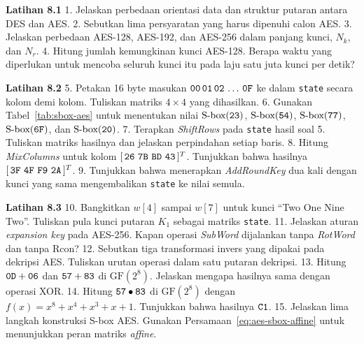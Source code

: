 \begin{obereflection}
\textbf{Latihan 8.1}
1. Jelaskan perbedaan orientasi data dan struktur putaran antara DES dan AES.
2. Sebutkan lima persyaratan yang harus dipenuhi calon AES.
3. Jelaskan perbedaan AES-128, AES-192, dan AES-256 dalam panjang kunci,
   $N_k$, dan $N_r$.
4. Hitung jumlah kemungkinan kunci AES-128. Berapa waktu yang diperlukan untuk
   mencoba seluruh kunci itu pada laju satu juta kunci per detik?

\textbf{Latihan 8.2}
5. Petakan 16 byte masukan $\texttt{00}\,\texttt{01}\,\texttt{02}\,\dots\,\texttt{0F}$
   ke dalam \texttt{state} secara kolom demi kolom. Tuliskan matriks
   $4 \times 4$ yang dihasilkan.
6. Gunakan Tabel~\ref{tab:sbox-aes} untuk menentukan nilai
   $\text{S-box}(\texttt{23})$, $\text{S-box}(\texttt{54})$,
   $\text{S-box}(\texttt{77})$, $\text{S-box}(\texttt{6F})$, dan
   $\text{S-box}(\texttt{20})$.
7. Terapkan \textit{ShiftRows} pada \texttt{state} hasil soal 5. Tuliskan
   matriks hasilnya dan jelaskan perpindahan setiap baris.
8. Hitung \textit{MixColumns} untuk kolom
   $[\,\code{26}\ \code{7B}\ \code{BD}\ \code{43}\,]^{T}$. Tunjukkan bahwa
   hasilnya $[\,\code{3F}\ \code{4F}\ \code{F9}\ \code{2A}\,]^{T}$.
9. Tunjukkan bahwa menerapkan \textit{AddRoundKey} dua kali dengan kunci yang
   sama mengembalikan \texttt{state} ke nilai semula.

\textbf{Latihan 8.3}
10. Bangkitkan $w[4]$ sampai $w[7]$ untuk kunci
    ``Two One Nine Two''. Tuliskan pula kunci putaran $K_1$ sebagai matriks
    \texttt{state}.
11. Jelaskan aturan \textit{expansion key} pada AES-256. Kapan operasi
    \textit{SubWord} dijalankan tanpa \textit{RotWord} dan tanpa Rcon?
12. Sebutkan tiga transformasi invers yang dipakai pada dekripsi AES. Tuliskan
    urutan operasi dalam satu putaran dekripsi.
13. Hitung $\texttt{0D} + \texttt{06}$ dan $\texttt{57} + \texttt{83}$ di
    $\text{GF}(2^8)$. Jelaskan mengapa hasilnya sama dengan operasi XOR.
14. Hitung $\texttt{57} \bullet \texttt{83}$ di $\text{GF}(2^8)$ dengan
    $f(x) = x^8 + x^4 + x^3 + x + 1$. Tunjukkan bahwa hasilnya $\texttt{C1}$.
15. Jelaskan lima langkah konstruksi S-box AES. Gunakan
    Persamaan~\eqref{eq:aes-sbox-affine} untuk menunjukkan peran matriks
    \textit{affine}.
\end{obereflection}
